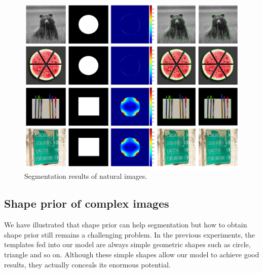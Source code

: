 \documentclass[review,onefignum,onetabnum]{siamonline190516}
\begin{document}
\begin{figure}
    \begin{center}
        \includegraphics[width=15.5cm]{src/exp3.png}
    \end{center}
    \caption{Segmentation results of natural images.}
    \label{exp3}
\end{figure}

\subsection{Shape prior of complex images}
We have illustrated that shape prior can help segmentation but how to obtain shape prior still remains a challenging problem. In the previous experiments, the templates fed into our model are always simple geometric shapes such as circle, triangle and so on. Although these simple shapes allow our model to achieve good results, they actually conceals its enormous potential.
\end{document}
